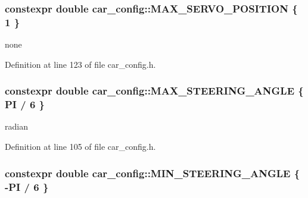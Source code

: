 \subsubsection[{\texorpdfstring{M\+A\+X\+\_\+\+S\+E\+R\+V\+O\+\_\+\+P\+O\+S\+I\+T\+I\+ON}{MAX_SERVO_POSITION}}]{\setlength{\rightskip}{0pt plus 5cm}constexpr double car\+\_\+config\+::\+M\+A\+X\+\_\+\+S\+E\+R\+V\+O\+\_\+\+P\+O\+S\+I\+T\+I\+ON \{ 1 \}}\hypertarget{namespacecar__config_af1712762f3ad9f8805ba474d5f3e7274}{}\label{namespacecar__config_af1712762f3ad9f8805ba474d5f3e7274}


none 



Definition at line 123 of file car\+\_\+config.\+h.

\subsubsection[{\texorpdfstring{M\+A\+X\+\_\+\+S\+T\+E\+E\+R\+I\+N\+G\+\_\+\+A\+N\+G\+LE}{MAX_STEERING_ANGLE}}]{\setlength{\rightskip}{0pt plus 5cm}constexpr double car\+\_\+config\+::\+M\+A\+X\+\_\+\+S\+T\+E\+E\+R\+I\+N\+G\+\_\+\+A\+N\+G\+LE \{ {\bf PI} / 6 \}}\hypertarget{namespacecar__config_a967b325af26effe80fbbc64dc68a36a0}{}\label{namespacecar__config_a967b325af26effe80fbbc64dc68a36a0}


radian 



Definition at line 105 of file car\+\_\+config.\+h.

\subsubsection[{\texorpdfstring{M\+I\+N\+\_\+\+S\+T\+E\+E\+R\+I\+N\+G\+\_\+\+A\+N\+G\+LE}{MIN_STEERING_ANGLE}}]{\setlength{\rightskip}{0pt plus 5cm}constexpr double car\+\_\+config\+::\+M\+I\+N\+\_\+\+S\+T\+E\+E\+R\+I\+N\+G\+\_\+\+A\+N\+G\+LE \{ -\/{\bf PI} / 6 \}}\hypertarget{namespacecar__config_a38229ce5d2e17e0c30b86864fb20d9ce}{}\label{namespacecar__config_a38229ce5d2e17e0c30b86864fb20d9ce}


